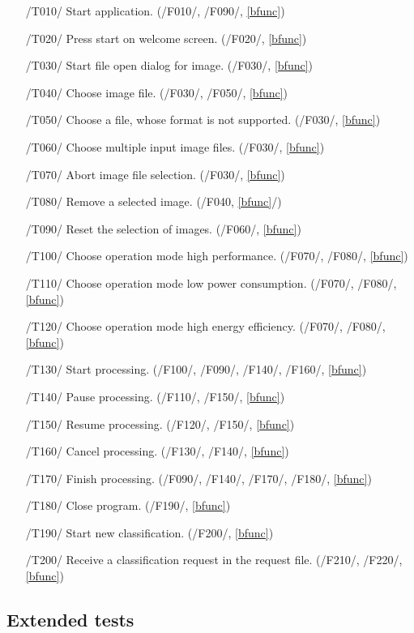 \documentclass[parskip=full]{scrartcl}
\begin{document}
\begin{itemize}
	\item[/T010/] Start application. (/F010/, /F090/, \ref{bfunc})
	\item[/T020/] Press start on welcome screen. (/F020/, \ref{bfunc})
	\item[/T030/] Start file open dialog for image. (/F030/, \ref{bfunc})
	\item[/T040/] Choose image file. (/F030/, /F050/, \ref{bfunc})
	\item[/T050/] Choose a file, whose format is not supported. (/F030/, \ref{bfunc})
	\item[/T060/] Choose multiple input image files. (/F030/, \ref{bfunc})
	\item[/T070/] Abort image file selection. (/F030/, \ref{bfunc})
	\item[/T080/] Remove a selected image. (/F040, \ref{bfunc}/)
	\item[/T090/] Reset the selection of images. (/F060/, \ref{bfunc})
	\item[/T100/] Choose operation mode high performance. (/F070/, /F080/, \ref{bfunc})
	\item[/T110/] Choose operation mode low power consumption. (/F070/, /F080/, \ref{bfunc})
	\item[/T120/] Choose operation mode high energy efficiency. (/F070/, /F080/, \ref{bfunc})
	\item[/T130/] Start processing. (/F100/, /F090/, /F140/, /F160/, \ref{bfunc})
	\item[/T140/] Pause processing. (/F110/, /F150/, \ref{bfunc})
	\item[/T150/] Resume processing. (/F120/, /F150/, \ref{bfunc})
	\item[/T160/] Cancel processing. (/F130/, /F140/, \ref{bfunc})
	\item[/T170/] Finish processing. (/F090/, /F140/, /F170/, /F180/, \ref{bfunc})
	\item[/T180/] Close program. (/F190/, \ref{bfunc})
	\item[/T190/] Start new classification. (/F200/, \ref{bfunc})
	\item[/T200/] Receive a classification request in the request file. (/F210/, /F220/, \ref{bfunc})
\end{itemize}

\pagebreak



\subsection {Extended tests}
\end{document}
